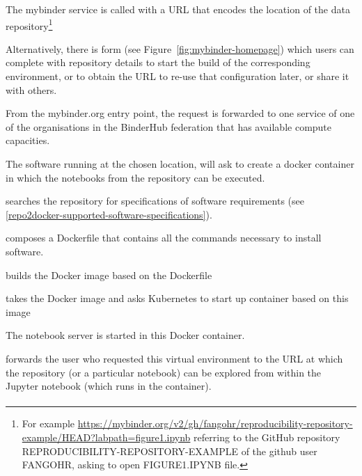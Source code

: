 \begin{compactitem}
\item The mybinder service is called with a URL that encodes the location of the data
  repository\footnote{For example
    {\url{https://mybinder.org/v2/gh/fangohr/reproducibility-repository-example/HEAD?labpath=figure1.ipynb}}
    referring to the GitHub repository REPRODUCIBILITY-REPOSITORY-EXAMPLE of the
    github user FANGOHR, asking to open FIGURE1.IPYNB file.}

  Alternatively, there is form (see Figure~\ref{fig:mybinder-homepage})
  which users can complete with repository details
  to start the build of the corresponding environment, or to obtain the URL to
  re-use that configuration later, or share it with others.
\item From the mybinder.org entry point, the request is forwarded to one
  \binderhub{} service of one of the organisations in the BinderHub federation
  that has available compute capacities.
\item The \binderhub{} software running at the chosen location, will ask
  \repotodocker{} to create a docker container in which the notebooks from the repository can be executed.
\item \repotodocker{} searches the repository for specifications of software requirements (see \ref{repo2docker-supported-software-specifications}).
\item \repotodocker{} composes a Dockerfile that contains all the commands
  necessary to install software.
\item \repotodocker{} builds the Docker image based on the Dockerfile
\item \binderhub{} takes the Docker image and asks Kubernetes to start up
  container based on this image
\item The notebook server is started in this Docker container.
\item \binderhub{} forwards the user who requested this virtual environment to
  the URL at which the repository (or a particular notebook) can be explored
  from within the Jupyter notebook (which runs in the container).
\end{compactitem}

\paragraph{\repotodocker}\label{sec:repo2docker}

